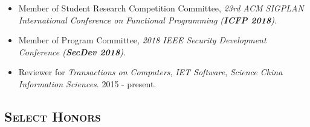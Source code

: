 \documentclass[10pt]{article}
\renewcommand{\section}[1]{
	\vspace{-5pt}
   	\subsection*{\scshape  \bfseries #1}
   }
\newenvironment{innerlist}[1][\enskip\textbullet]%
        {\begin{itemize}[#1,leftmargin=25pt,parsep=0pt,itemsep=2pt,topsep=2pt,partopsep=0pt]}
        {\end{itemize}}
\begin{document}
\begin{innerlist}
\item[]  Member of Student Research Competition Committee, 
\emph{23rd ACM SIGPLAN International Conference on Functional Programming (\textbf{ICFP 2018})}.
\vspace{0.05in}


\item[] Member of Program Committee,
\emph{2018 IEEE Security Development Conference (\textbf{SecDev 2018})}.
\vspace{0.05in}

\item[] Reviewer for
\emph{Transactions on Computers},
\emph{IET Software},
\emph{Science China Information Sciences}. 2015 - present.

\end{innerlist}

\section{Select Honors}
\end{document}
